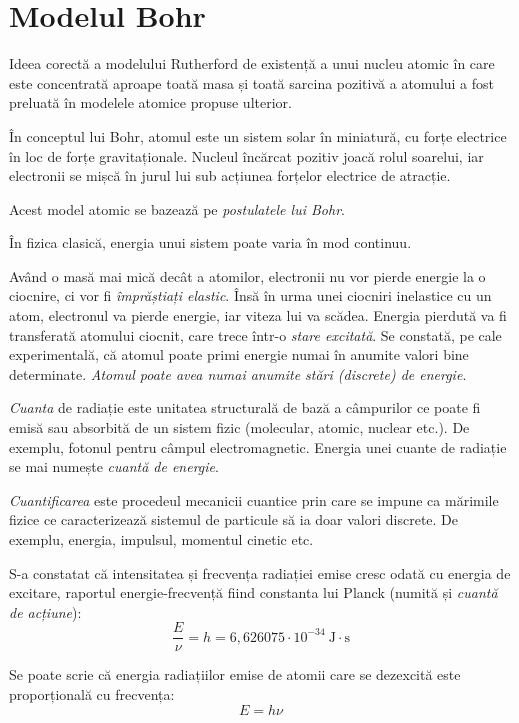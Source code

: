 \section{Modelul Bohr}

Ideea corectă a modelului Rutherford de existență a unui nucleu atomic în care
este concentrată aproape toată masa și toată sarcina pozitivă a atomului a fost
preluată în modelele atomice propuse ulterior.

În conceptul lui Bohr, atomul este un sistem solar în miniatură, cu forțe
electrice în loc de forțe gravitaționale. Nucleul încărcat pozitiv joacă rolul
soarelui, iar electronii se mișcă în jurul lui sub acțiunea forțelor electrice
de atracție.

Acest model atomic se bazează pe \emph{postulatele lui Bohr}.

În fizica clasică, energia unui sistem poate varia în mod continuu.

Având o masă mai mică decât a atomilor, electronii nu vor pierde energie la o
ciocnire, ci vor fi \emph{împrăștiați elastic}. Însă în urma unei ciocniri
inelastice cu un atom, electronul va pierde energie, iar viteza lui va scădea.
Energia pierdută va fi transferată atomului ciocnit, care trece într-o
\emph{stare excitată}. Se constată, pe cale experimentală, că atomul poate
primi energie numai în anumite valori bine determinate.
\emph{Atomul poate avea numai anumite stări (discrete) de energie}.

\emph{Cuanta} de radiație este unitatea structurală de bază a câmpurilor ce
poate fi emisă sau absorbită de un sistem fizic (molecular, atomic, nuclear
etc.). De exemplu, fotonul pentru câmpul electromagnetic. Energia unei cuante
de radiație se mai numește \emph{cuantă de energie}.

\emph{Cuantificarea} este procedeul mecanicii cuantice prin care se impune ca
mărimile fizice ce caracterizează sistemul de particule să ia doar valori
discrete. De exemplu, energia, impulsul, momentul cinetic etc.

S-a constatat că intensitatea și frecvența radiației emise cresc odată cu
energia de excitare, raportul energie-frecvență fiind constanta lui Planck
(numită și \emph{cuantă de acțiune}):
\[ \frac{E}{\nu} = h = 6,626075 \cdot 10^{-34} ~ \mathrm{J \cdot s} \]

Se poate scrie că energia radiațiilor emise de atomii care se dezexcită este
proporțională cu frecvența:
\[ E = h\nu \]

